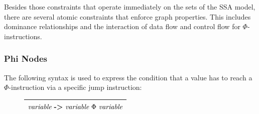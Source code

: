 
    Besides those constraints that operate immediately on the sets of the
    SSA model, there are several atomic constraints that enforce graph
    properties.
    This includes dominance relationships and the interaction of data flow and
    control flow for $\Phi$-instructions.


\subsubsection{Phi Nodes}

    The following syntax is used to express the condition that a value has to
    reach a $\Phi$-instruction via a specific jump instruction:
\begin{figure}[h]
    \centering
    \begin{tabular}{|c|}
        \hline
        $\text{\it variable}\ \text{\bf ->}\ \text{\it variable}\ \Phi\ \text{\it variable}$\\
        \hline
    \end{tabular}
\end{figure}

